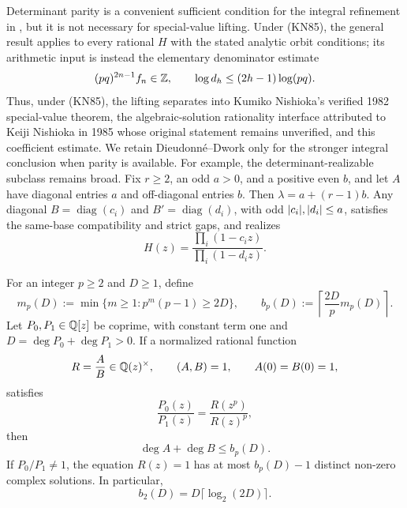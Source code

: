 \begin{remark}
Determinant parity is a convenient sufficient condition for the integral
refinement in , but it is not necessary
for special-value lifting.  Under \textup{(KN85)}, the general result
 applies to every rational \(H\)
with the stated analytic orbit conditions; its arithmetic input is instead
the elementary denominator estimate
\[
 (pq)^{2n-1}f_n\in\mathbb{Z},\qquad
 \log d_h\le(2h-1)\log(pq).
\]
Thus, under \textup{(KN85)}, the lifting separates into Kumiko Nishioka's
verified 1982 special-value
theorem, the algebraic-solution rationality interface attributed to Keiji
Nishioka in 1985 whose original statement remains unverified, and this
coefficient estimate.  We retain
Dieudonn\'e--Dwork only for the stronger integral conclusion when parity is
available.  For example, the determinant-realizable subclass remains broad.
Fix \(r\ge2\), an odd \(a>0\), and a positive even \(b\), and let \(A\) have
diagonal entries \(a\) and off-diagonal entries \(b\).  Then
\(\lambda=a+(r-1)b\).  Any diagonal \(B=\operatorname{diag}(c_i)\) and
\(B'=\operatorname{diag}(d_i)\), with odd
\(\lvert c_i \rvert,\lvert d_i \rvert\le a\), satisfies the same-base compatibility and
strict gaps, and realizes
\[
 H(z)=\frac{\prod_i(1-c_i z)}{\prod_i(1-d_i z)}.
\]
\end{remark}

\begin{proposition}
\label{prop:logarithmic-mahler-divisor-bound}
For an integer \(p\ge2\) and \(D\ge1\), define
\begin{equation}\label{eq:logarithmic-mahler-bound-definition}
 m_p(D):=\min\{m\ge1:p^m(p-1)\ge2D\},
 \qquad
 b_p(D):=\left\lceil\frac{2D}{p}m_p(D)\right\rceil.
\end{equation}
Let \(P_0,P_1\in\mathbb{Q}[z]\) be coprime, with constant term one and
\(D=\deg P_0+\deg P_1>0\).  If a normalized rational function
\[
 R=\frac AB\in\mathbb{Q}(z)^\times,
 \qquad (A,B)=1,\qquad A(0)=B(0)=1,
\]
satisfies
\begin{equation}\label{eq:p-mahler-coboundary}
 \frac{P_0(z)}{P_1(z)}=\frac{R(z^p)}{R(z)^p},
\end{equation}
then
\begin{equation}\label{eq:logarithmic-mahler-degree-bound}
 \deg A+\deg B\le b_p(D).
\end{equation}
If \(P_0/P_1\ne1\), the equation \(R(z)=1\) has at most
\(b_p(D)-1\) distinct non-zero complex solutions.  In particular,
\begin{equation}\label{eq:binary-logarithmic-mahler-degree-bound}
 b_2(D)=D\lceil\log_2(2D)\rceil.
\end{equation}
\end{proposition}

